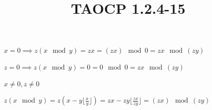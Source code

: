 \documentclass{article}
\title{TAOCP 1.2.4\mbox{-}15}
\begin{document}
\maketitle

\( x = 0 \implies z(x \mod y) = zx = (zx) \mod 0 = zx \mod (zy) \)

\( z = 0 \implies z(x \mod y) = 0 = 0 \mod 0 = zx \mod (zy) \)

\( x \neq 0, z \neq 0 \)

\( z(x \mod y)=z(x-y\lfloor\frac{x}{y}\rfloor) = zx - zy \lfloor\frac{zx}{zy}\rfloor = (zx) \mod (zy) \)
\end{document}
